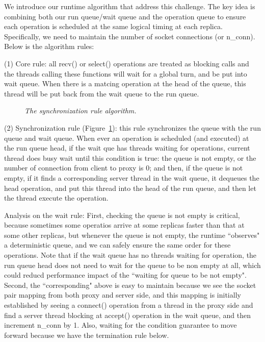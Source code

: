We introduce our runtime algorithm that address this challenge. The key idea is 
combining both our \smt run queue/wait queue and the \paxos operation queue to 
ensure each \paxos operation is scheduled at the same logical timing at each 
replica. Specifically, we need to maintain %
the number of socket connections (or n\_conn). Below is the 
algorithm rules:

(1) Core rule: all recv() or select() operations are treated as blocking calls and the 
threads calling these functions will wait for a global \smt turn, and be put into wait 
queue. When there is a matcing \paxos operation at the head of the \paxos 
queue, this thread will be put back from the wait queue to the run queue.

\begin{figure}[t]
\begin{minipage}{.5\textwidth}
\end{minipage}
\vspace{-.1in}
\caption{{\em The synchronization rule algorithm.}} \label{fig:msmr-wait-rule}
\vspace{-.05in}
\end{figure}

(2) Synchronization rule (Figure~\ref{fig:msmr-wait-rule}): this rule synchronizes the \paxos queue with the 
\smt run queue and wait queue. When ever an operation is scheduled (and executed) at the \smt run queue 
head, if the wait que has threads waiting for \paxos operations, current thread does busy wait until
this condition is true: the \paxos queue is not empty, 
or the number of connection from client to proxy is 0; and then, if the \paxos 
queue is not empty, if it finds a 
corresponding server thread in the wait queue, it dequeues the head \paxos operation, 
and put this thread into the head of the run 
queue, and then let the thread execute the \paxos operation. 

Analysis on the wait rule: First, checking the \paxos queue is not 
empty is critical, because sometimes some operatios arrive at some replicas 
faster than that at some other replicas, but whenever the \paxos queue is not 
empty, the \smt runtime ``observes" a deterministic \paxos queue, and
we can safely ensure the same order for these \paxos operations.
Note that if the wait queue has no threads waiting for \paxos operation, the 
run queue head does not need to wait for the \paxos queue to be non empty at 
all, which could reducd performance impact of the ``waiting for \paxos queue to be not empty".
Second, the ``corresponding" above is easy to maintain because we see the socket pair mapping from 
both proxy and server side, and this mapping is initially established by seeing 
a connect() operation from a thread in the proxy side and find a server thread blocking at accept() 
operation in the wait queue, and then increment n\_conn by 1. Also, waiting for the 
condition guarantee to move forward because we have the termination rule below.

